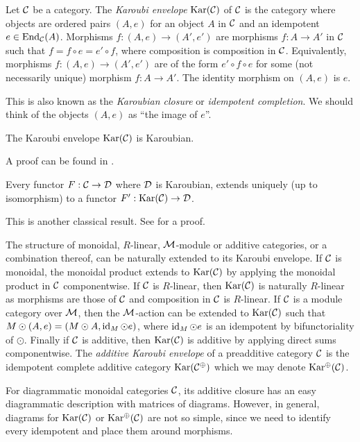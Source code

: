 \begin{definition}
    Let $\mathcal{C}$ be a category. The \textit{Karoubi envelope} $\operatorname{Kar}(\mathcal{C})$ of $\mathcal{C}$ is the category where objects are ordered pairs $(A,e)$ for an object $A$ in $\mathcal{C}$ and an idempotent $e \in \operatorname{End}_{\mathcal{C}}(A)$.  Morphisms $f: (A, e) \to (A', e')$ are morphisms $f:A \to A'$ in $\mathcal{C}$ such that $f = f \circ e = e' \circ f$, where composition is composition in $\mathcal{C}$. Equivalently, morphisms $f: (A, e) \to (A', e')$ are of the form $e'\circ f \circ e$ for some (not necessarily unique) morphism $f: A \to A'$. The identity morphism on $(A,e)$ is $e$.
\end{definition}

This is also known as the \textit{Karoubian closure} or \textit{idempotent completion}. We should think of the objects $(A,e)$ as ``the image of $e$''.

\begin{proposition}
    The Karoubi envelope $\operatorname{Kar}(\mathcal{C})$ is Karoubian.
\end{proposition}

A proof can be found in \cite[Lemma 11.17]{intro-soergel-bimodules}.

\begin{lemma}
    Every functor $F: \mathcal{C} \to \mathcal{D}$ where $\mathcal{D}$ is Karoubian, extends uniquely (up to isomorphism) to a functor $F': \operatorname{Kar}(\mathcal{C}) \to \mathcal{D}$.
\end{lemma}

This is another classical result. See \cite[Proposition 6.5.9 (1)]{borceux-categorical-algebra} for a proof.

The structure of monoidal, $R$-linear, $\mathcal{M}$-module or additive categories, or a combination thereof, can be naturally extended to its Karoubi envelope. If $\mathcal{C}$ is monoidal, the monoidal product extends to $\operatorname{Kar}(\mathcal{C})$ by applying the monoidal product in $\mathcal{C}$ componentwise. If $\mathcal{C}$ is $R$-linear, then $\operatorname{Kar}(\mathcal{C})$ is naturally $R$-linear as morphisms are those of $\mathcal{C}$ and composition in $\mathcal{C}$ is $R$-linear. If $\mathcal{C}$ is a module category over $\mathcal{M}$, then the $\mathcal{M}$-action can be extended to $\operatorname{Kar}(\mathcal{C})$ such that $M \odot (A,e) = (M \odot A, \operatorname{id}_M \odot e)$, where $\operatorname{id}_M \odot e$ is an idempotent by bifunctoriality of $\odot$. Finally if $\mathcal{C}$ is additive, then $\operatorname{Kar}(\mathcal{C})$ is additive by applying direct sums componentwise. The \textit{additive Karoubi envelope} of a preadditive category $\mathcal{C}$ is the idempotent complete additive category $\operatorname{Kar}(\mathcal{C}^\oplus)$ which we may denote $\operatorname{Kar^\oplus}(\mathcal{C})$.

For diagrammatic monoidal categories $\mathcal{C}$, its additive closure has an easy diagrammatic description with matrices of diagrams. However, in general, diagrams for $\operatorname{Kar}(\mathcal{C})$ or $\operatorname{Kar^\oplus}(\mathcal{C})$ are not so simple, since we need to identify every idempotent and place them around morphisms.




